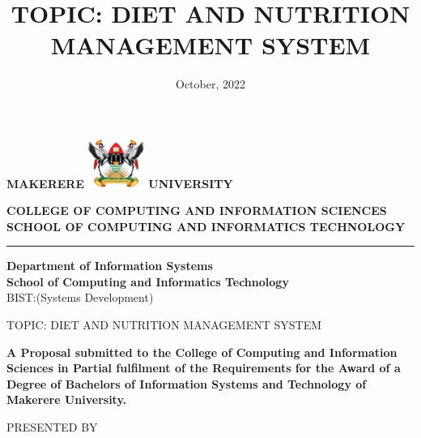 \documentclass{article}
\begin{document}
\title{\textbf{TOPIC:  DIET AND NUTRITION MANAGEMENT SYSTEM} }
\author{}
\date{October, 2022}
\begin{center}


\textbf{\LARGE{MAKERERE}} \includegraphics[width=70px]{muk_logo.png} \textbf{\LARGE{UNIVERSITY}}


\begin{center}
\textbf{COLLEGE OF COMPUTING AND INFORMATION SCIENCES\\ SCHOOL OF COMPUTING AND INFORMATICS TECHNOLOGY}

\end{center}

\hrule
\begin{center}
\textbf{Department of Information Systems}\\
\textbf{School of Computing and Informatics Technology}
\\ BIST:(Systems Development)
\end{center}


\vspace{15pt} 

{\LARGE TOPIC:  DIET AND NUTRITION MANAGEMENT SYSTEM}\\

\begin{center}
\textbf{A Proposal submitted to the College of Computing and Information Sciences in Partial fulfilment of the Requirements for the Award of a Degree of Bachelors of Information Systems and Technology of Makerere University.}
\end{center}


PRESENTED BY
\vspace{-9pt} 

\begin{table}[H]
\centering
{}
\end{table}




\end{center}
\end{document}
